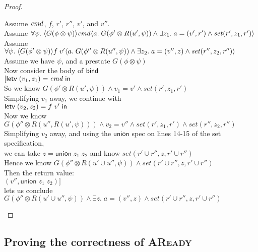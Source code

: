 \begin{proof}
\begin{tabbedproof}
\oo Assume $\mathit{cmd}$, $f$, $r'$, $r''$, $v'$, and $v''$. \\
\oo Assume $\forall \psi.\; \langle{G(\phi \otimes \psi)}\rangle{\mathit{cmd}}\langle{a}.\;{G(\phi' \otimes R(u', \psi)) \land \exists z_1.\;a = (v', r') \land \mathit{set}(r', z_1, r')}\rangle$ \\
\oo Assume $\forall \psi.\; \langle{G(\phi' \otimes \psi)}\rangle{f\;v'}\langle{a}.\;{G(\phi'' \otimes R(u'', \psi)) \land \exists z_2.\; a = (v'', z) \land \mathit{set}(r'', z_2, r'')}\rangle$ \\
\oo Assume we have $\psi$, and a prestate $G(\phi \otimes \psi)$ \\
\ooo Now consider the body of $\mathsf{bind}\;$ \\
\ooo $[\mathsf{letv}\;(v_1, z_1) = \mathit{cmd}\;\mathsf{in}\;$ \\
\ooo So we know $G(\phi' \otimes R(u', \psi)) \land v_1 = v' \land \mathit{set}(r', z_1, r')$ \\
\ooo Simplifying $v_1$ away, we continue with \\
\ooo $\mathsf{letv}\;(v_2, z_2) = f\;v'\;\mathsf{in}\;$ \\
\ooo Now we know $G(\phi'' \otimes R(u'', R(u', \psi))) \land v_2 = v'' \land \mathit{set}(r', z_1, r') \land \mathit{set}(r'', z_2, r'')$ \\
\ooo Simplifying $v_2$ away, and using the $\textsf{union}$ spec on lines 14-15 of the set specification, \\
\ooo we can take $z = \mathsf{union}\;z_1\;z_2$ and know $\mathit{set}(r' \cup r'', z, r' \cup r'')$ \\
\ooo Hence we know $G(\phi'' \otimes R(u' \cup u'', \psi)) \land \mathit{set}(r' \cup r'', z, r' \cup r'')$ \\
\ooo Then the return value: \\
\ooo $(v'', \mathsf{union}\;z_1\;z_2)]$ \\
\ooo lets us conclude $G(\phi'' \otimes R(u' \cup u'', \psi)) \land \exists z.\; a = (v'', z) \land \mathit{set}(r' \cup r'', z, r' \cup r'')$ 
\end{tabbedproof}
\end{proof}

\subsection{Proving the correctness of \textsc{AReady}}

